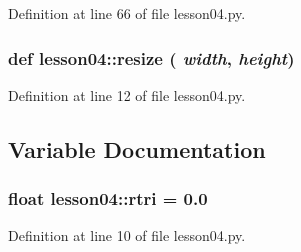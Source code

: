 Definition at line 66 of file lesson04.py.
\subsubsection{\setlength{\rightskip}{0pt plus 5cm}def lesson04::resize ( {\em width},  {\em height})}\label{namespacelesson04_ef4c896eab0d7919e5ec2c1fdbf7e5e6}




Definition at line 12 of file lesson04.py.

\subsection{Variable Documentation}
\subsubsection{\setlength{\rightskip}{0pt plus 5cm}float {\bf lesson04::rtri} = 0.0\hspace{0.3cm}{\tt  [static]}}\label{namespacelesson04_89be25b4131acca2a96e2711a7ec4542}




Definition at line 10 of file lesson04.py.